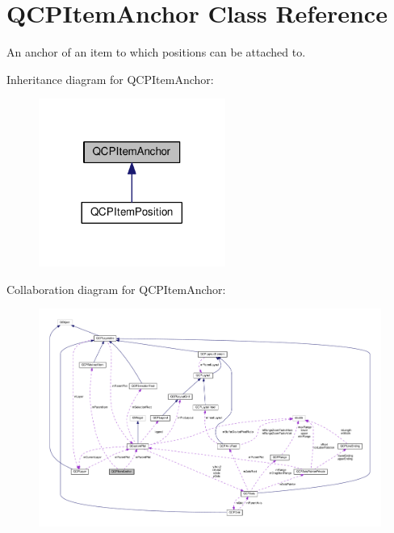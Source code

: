 \hypertarget{classQCPItemAnchor}{}\section{Q\+C\+P\+Item\+Anchor Class Reference}
\label{classQCPItemAnchor}


An anchor of an item to which positions can be attached to.  




Inheritance diagram for Q\+C\+P\+Item\+Anchor\+:
\nopagebreak
\begin{figure}[H]
\begin{center}
\leavevmode
\includegraphics[width=173pt]{classQCPItemAnchor__inherit__graph}
\end{center}
\end{figure}


Collaboration diagram for Q\+C\+P\+Item\+Anchor\+:
\nopagebreak
\begin{figure}[H]
\begin{center}
\leavevmode
\includegraphics[width=350pt]{classQCPItemAnchor__coll__graph}
\end{center}
\end{figure}
